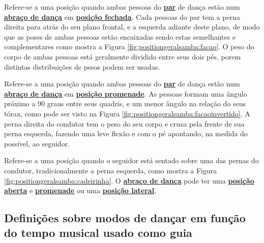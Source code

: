 \begin{definition}
\label{def:facao-position} 
Refere-se a uma posição quando ambas pessoas do \hyperref[def:Par]{\textbf{par}} de dança
estão num \hyperref[def:abracodedanca]{\textbf{abraço de dança}}
em \hyperref[def:closed-position]{\textbf{posição fechada}}.
Cada pessoas do par tem a perna direita para atrás do seu plano frontal,
e a esquerda adiante deste plano, de modo que as poses de ambas pessoas estão
encaixadas sendo estas semelhantes e complementares como mostra a Figura \ref{fig:positiongeralsamba:facao}.
O peso do corpo de ambas pessoas está geralmente dividido entre seus dois pés,
porem distintas distribuições de pesos podem ser usadas.
\end{definition}

\begin{definition}
\label{def:facao-invertido-position} 
Refere-se a uma posição quando ambas pessoas do \hyperref[def:Par]{\textbf{par}} 
de dança estão num \hyperref[def:abracodedanca]{\textbf{abraço de dança}}
em \hyperref[def:promenade-position]{\textbf{posição promenade}}.
As pessoas formam uma ângulo próximo a 90 graus entre seus quadris,
e um menor ângulo na relação do seus tórax, como pode ser visto na Figura \ref{fig:positiongeralsamba:facaoinvertido}.
A perna direita do condutor tem o peso do seu corpo e 
cruza pela frente de sua perna esquerda, fazendo uma leve flexão e com o pé apontando,
na medida do possível, ao seguidor.
\end{definition}

\begin{definition}
\label{def:cadeirinha-position} 
Refere-se a uma posição quando o seguidor está sentado sobre uma das pernas do condutor,
tradicionalmente a perna esquerda, como mostra a Figura \ref{fig:positiongeralsamba:cadeirinha}.
O \hyperref[def:abracodedanca]{\textbf{abraço de dança}} pode ter 
uma \hyperref[def:open-position]{\textbf{posição aberta}} e 
\hyperref[def:promenade-position]{\textbf{promenade}}
ou uma  \hyperref[def:lateral-position]{\textbf{posição lateral}}.
\end{definition}

\subsection{Definições sobre modos de dançar em função do tempo musical usado como guia}



